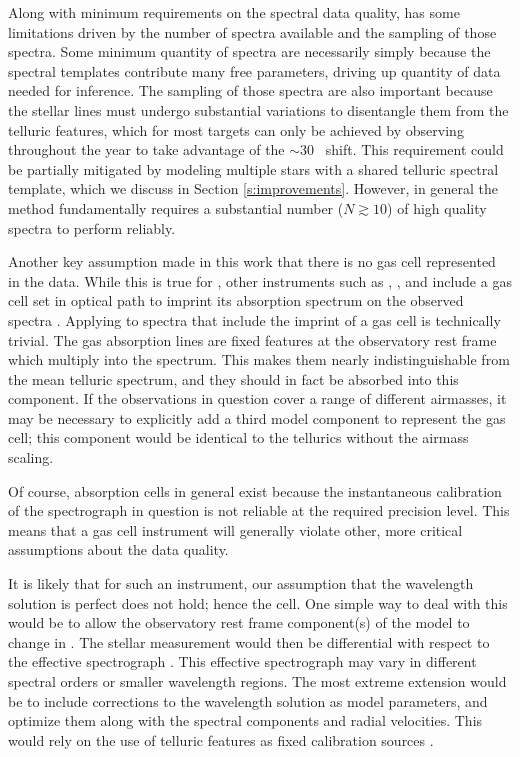 \documentclass[twocolumn]{aastex62}
\begin{document}
Along with minimum requirements on the spectral data quality, \wobble has some limitations driven by the number of spectra available and the sampling of those spectra. 
Some minimum quantity of spectra are necessarily simply because the spectral templates contribute many free parameters, driving up quantity of data needed for inference. 
The sampling of those spectra are also important because the stellar lines must undergo substantial \RV variations to disentangle them from the telluric features, which for most targets can only be achieved by observing throughout the year to take advantage of the $\sim 30$ \kms~\BERV shift. 
This requirement could be partially mitigated by modeling multiple stars with a shared telluric spectral template, which we discuss in Section \ref{s:improvements}. 
However, in general the \wobble method fundamentally requires a substantial number ($N \gtrsim 10$) of high quality spectra to perform reliably.

Another key assumption made in this work that there is no gas cell represented in the data. 
While this is true for \HARPS, other instruments such as , , and  include a gas cell set in optical path to imprint its absorption spectrum on the observed spectra \citep{Butler1996, Crane2010, Vogt2014}. 
Applying \wobble to spectra that include the imprint of a gas cell is technically trivial. 
The gas absorption lines are fixed features at the observatory rest frame which multiply into the spectrum. 
This makes them nearly indistinguishable from the mean telluric spectrum, and they should in fact be absorbed into this component. 
If the observations in question cover a range of different airmasses, it may be necessary to explicitly add a third model component to represent the gas cell; this component would be identical to the tellurics without the airmass scaling. 

Of course, absorption cells in general exist because the instantaneous calibration of the spectrograph in question is not reliable at the required \RV precision level. 
This means that a gas cell instrument will generally violate other, more critical assumptions about the data quality. 

It is likely that for such an instrument, our assumption that the wavelength solution is perfect does not hold; hence the cell. 
One simple way to deal with this would be to allow the observatory rest frame component(s) of the model to change in \RV. 
The stellar \RV measurement would then be differential with respect to the effective spectrograph \RV. 
This effective spectrograph \RV may vary in different spectral orders or smaller wavelength regions.
The most extreme extension would be to include corrections to the wavelength solution as model parameters, and optimize them along with the spectral components and radial velocities. 
This would rely on the use of telluric features as fixed calibration sources \citep{Seifahrt2010}.
\end{document}
